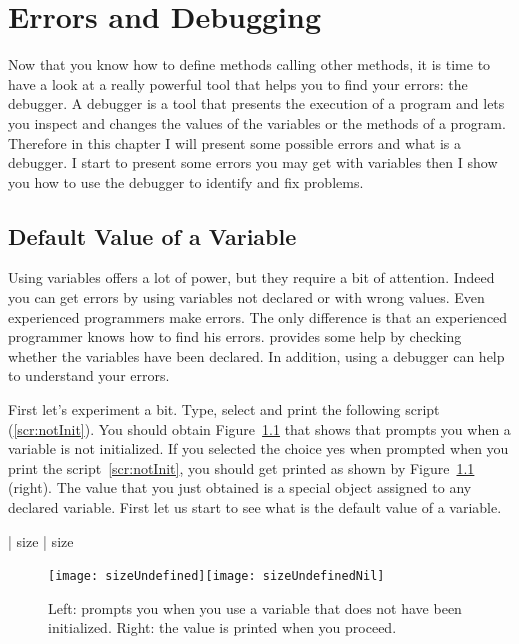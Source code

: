 \ifx\wholebook\relax\else



\fi

\chapter{Errors and Debugging}\label{ch:debugger}

Now that you know how to define methods calling other methods, it is time to have a look at a really powerful tool that helps you to find your errors: the \sq debugger. A debugger is a tool that presents  the execution of a program and lets you inspect and changes the values of the variables or the methods of a program. Therefore in this chapter I will present some possible errors and what is a debugger. I start to present some errors you may get with variables then I show you how to use the debugger to identify and fix problems.




\section{Default Value of a Variable}
Using variables offers a lot of power, but they require a bit of attention. Indeed you can get errors by using variables not declared or with wrong values.  Even experienced programmers make errors. The only difference is that an experienced programmer knows how to find his errors. \sq provides some help by checking whether the variables have been declared. In addition, using a debugger can help to understand your errors. 



First let's  experiment a bit. Type, select and print the following script (\ref{scr:notInit}). You should obtain Figure~\ref{fig:undefinedVar} that shows that \sq prompts you when a variable is not initialized. If you selected the choice yes when prompted when you print the script~\ref{scr:notInit}, you should get \nil printed as shown by Figure~\ref{fig:undefinedVar} (right). The value \nil that you just obtained is a special object assigned to any declared variable. First let us start to see what is the default value of a variable.

\begin{scriptwithouttitle}\label{scr:notInit}
| size |
size 
\end{scriptwithouttitle}

\begin{figure}
\centerline{\texttt{[image: sizeUndefined]}\texttt{[image: sizeUndefinedNil]}}
\caption{Left: \sq prompts you when you use a variable that does not have been initialized. Right: the value \nil is printed when you proceed.\label{fig:undefinedVar}}
\end{figure}


